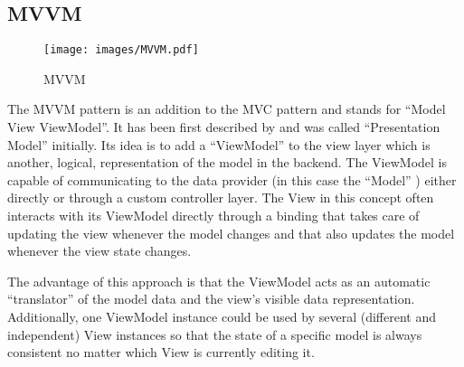 \subsection{MVVM}
\label{subsec:mvvm}

\begin{figure}[htb]
  \centerline{\texttt{[image: images/MVVM.pdf]}}
  \caption[MVVM]{MVVM}
  \label{fig:mvvm}
\end{figure}

The MVVM pattern is an addition to the MVC pattern and stands for ``Model View ViewModel''. It has been first described by \cite{fowler04mvvm} and was called ``Presentation Model'' initially. Its idea is to add a ``ViewModel'' to the view layer which is another, logical, representation of the model in the backend. The ViewModel is capable of communicating to the data provider (in this case the ``Model'' ) either directly or through a custom controller layer. The View in this concept often interacts with its ViewModel directly through a binding that takes care of updating the view whenever the model changes and that also updates the model whenever the view state changes.

The advantage of this approach is that the ViewModel acts as an automatic ``translator'' of the model data and the view's visible data representation. Additionally, one ViewModel instance could be used by several (different and independent) View instances so that the state of a specific model is always consistent no matter which View is currently editing it.